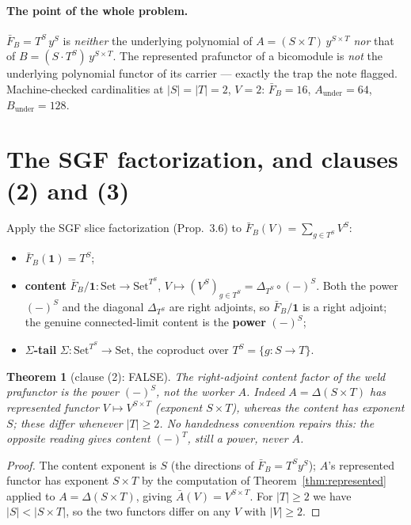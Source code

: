 \documentclass[11pt]{article}
\newtheorem{theorem}{Theorem}
\theoremstyle{definition}
\newcommand{\Set}{\mathrm{Set}}
\begin{document}
\paragraph{The point of the whole problem.}
$\bar F_{B}=T^{S}\,y^{S}$ is \emph{neither} the underlying polynomial of
$A=(S\times T)\,y^{S\times T}$ \emph{nor} that of $B=(S\cdot T^{S})\,y^{S\times T}$. The
represented prafunctor of a bicomodule is \emph{not} the underlying polynomial functor of
its carrier --- exactly the trap the note flagged. Machine-checked cardinalities at
$|S|=|T|=2$, $V=2$: $\bar F_{B}=16$, $A_{\text{under}}=64$, $B_{\text{under}}=128$.

\section{The SGF factorization, and clauses (2) and (3)}\label{sec:factorization}

Apply the SGF slice factorization (Prop.~3.6) to
$\bar F_{B}(V)=\sum_{g\in T^{S}}V^{S}$:
\begin{itemize}
\item $\bar F_{B}(\mathbf 1)=T^{S}$;
\item \textbf{content} $\bar F_{B}/\mathbf 1\colon\Set\to\Set^{T^{S}}$,
$V\mapsto(V^{S})_{g\in T^{S}}=\Delta_{T^{S}}\circ(-)^{S}$. Both the power $(-)^{S}$ and the
diagonal $\Delta_{T^{S}}$ are right adjoints, so $\bar F_{B}/\mathbf 1$ is a right adjoint;
the genuine connected-limit content is the \textbf{power} $(-)^{S}$;
\item \textbf{$\Sigma$-tail} $\Sigma\colon\Set^{T^{S}}\to\Set$, the coproduct over
$T^{S}=\{g\colon S\to T\}$.
\end{itemize}

\begin{theorem}[clause (2): FALSE]\label{thm:clause2}
The right-adjoint content factor of the weld prafunctor is the power $(-)^{S}$, not the
worker $A$. Indeed $A=\Delta(S\times T)$ has represented functor $V\mapsto V^{S\times T}$
(exponent $S\times T$), whereas the content has exponent $S$; these differ whenever
$|T|\geq2$. No handedness convention repairs this: the opposite reading gives content
$(-)^{T}$, still a power, never $A$.
\end{theorem}

\begin{proof}
The content exponent is $S$ (the directions of $\bar F_{B}=T^{S}y^{S}$); $A$'s represented
functor has exponent $S\times T$ by the computation of Theorem~\ref{thm:represented}
applied to $A=\Delta(S\times T)$, giving $\bar A(V)=V^{S\times T}$. For $|T|\geq2$ we have
$|S|<|S\times T|$, so the two functors differ on any $V$ with $|V|\geq2$.
\end{proof}
\end{document}
